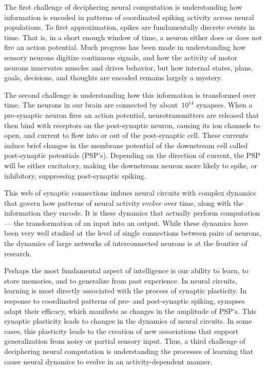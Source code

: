 The first challenge of deciphering neural computation is understanding
how information is encoded in patterns of coordinated spiking activity
across neural populations. To first approximation, spikes are
fundamentally discrete events in time.  That is, in a short enough
window of time, a neuron either does or does not fire an action
potential.  Much progress has been made in understanding how sensory
neurons digitize continuous signals, and how the activity of motor
neurons innervates muscles and drives behavior, but how internal
states, plans, goals, decisions, and thoughts are encoded remains
largely a mystery.


The second challenge is understanding how this information is
transformed over time. The neurons in our brain are connected by
about~$10^{14}$ synapses. When a pre-synaptic neuron fires an action
potential, neurotransmitters are released that then bind with
receptors on the post-synaptic neuron, causing its ion channels to
open, and current to flow into or out of the post-synaptic cell. These
currents induce brief changes in the membrane potential of the
downstream cell called post-synaptic potentials (PSP's). Depending on
the direction of current, the PSP will be either excitatory, making
the downstream neuron more likely to spike, or inhibitory, suppressing
post-synaptic spiking.


This web of synaptic connections imbues neural circuits with complex
dynamics that govern how patterns of neural activity evolve over time,
along with the information they encode. It is these dynamics that actually
perform computation --- the transformation of an input into an output.
While these dynamics have been very well studied at the level of
single connections between pairs of neurons, the dynamics of large
networks of interconnected neurons is at the frontier of research.

Perhaps the most fundamental aspect of intelligence is our ability to
learn, to store memories, and to generalize from past experience.  In
neural circuits, learning is most directly associated with the process
of synaptic plasticity. In response to coordinated patterns of pre-
and post-synaptic spiking, synapses adapt their efficacy, which
manifests as changes in the amplitude of PSP's. This synaptic
plasticity leads to changes in the dynamics of neural circuits.  In
some cases, this plasticity leads to the creation of new associations
that support generalization from noisy or partial sensory input.
Thus, a third challenge of deciphering neural computation is
understanding the processes of learning that cause neural dynamics to
evolve in an activity-dependent manner.

